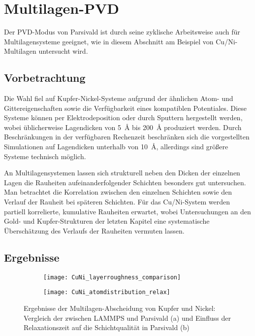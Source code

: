 \section{Multilagen-PVD}
\label{multilayer}

Der PVD-Modus von Parsivald ist durch seine zyklische Arbeitsweise auch für Multilagensysteme geeignet, wie in diesem Abschnitt am Beispiel von Cu/Ni-Multilagen untersucht wird.

\subsection{Vorbetrachtung}
Die Wahl fiel auf Kupfer-Nickel-Systeme aufgrund der ähnlichen Atom- und Gittereigenschaften sowie die Verfügbarkeit eines kompatiblen Potentiales.
Diese Systeme können per Elektro\-deposition oder durch Sputtern hergestellt werden, wobei üblicherweise Lagendicken von \SI{5}{\angstrom} bis \SI{200}{\angstrom} produziert werden.
Durch Beschränkungen in der verfügbaren Rechenzeit beschränken sich die vorgestellten Simulationen auf Lagendicken unterhalb von \SI{10}{\angstrom}, allerdings sind größere Systeme technisch möglich.

An Multilagensystemen lassen sich strukturell neben den Dicken der einzelnen Lagen die Rauheiten aufeinanderfolgender Schichten besonders gut untersuchen.
Man betrachtet die Korrelation zwischen den einzelnen Schichten sowie den Verlauf der Rauheit bei späteren Schichten.
Für das Cu/Ni-System werden partiell korrelierte, kumulative Rauheiten erwartet, wobei Untersuchungen an den Gold- und Kupfer-Strukturen der letzten Kapitel eine systematische Überschätzung des Verlaufs der Rauheiten vermuten lassen.

\subsection{Ergebnisse}

\begin{figure}
  \captionsetup[subfigure]{singlelinecheck=false}
  \def\subfigwidth{7cm}
  \begin{subfigure}[t]{\subfigwidth}
    \texttt{[image: CuNi\_layerroughness\_comparison]}
  \end{subfigure}
  \hfill
  \begin{subfigure}[t]{\subfigwidth}
    \texttt{[image: CuNi\_atomdistribution\_relax]}
  \end{subfigure}
  \caption[Ergebnisse der Multilagen-Abscheidung von Kupfer und Nickel]{
    Ergebnisse der Multilagen-Abscheidung von Kupfer und Nickel:
    Vergleich der zwischen LAMMPS und Parsivald (a) und Einfluss der Relaxationszeit auf die Schichtqualität in Parsivald (b)
  }
  \label{fig:multilayerplots}
\end{figure}

